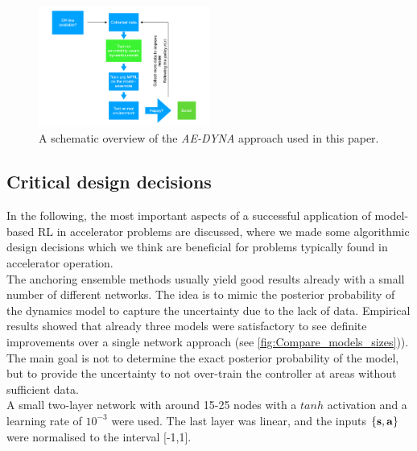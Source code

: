 \documentclass[
reprint,
amsmath,amssymb,amsfonts,clevref,
aps,
prstab,
]{revtex4-2}
\begin{document}
	\begin{figure}[!h]
		\centering
		\includegraphics*[width=0.5\textwidth]{Figures/MBRL_overview}
		\caption{A schematic overview of the \emph{AE-DYNA} approach used in this paper.}
		\label{fig:MBRL_overview}
	\end{figure}
	\subsection{Critical design decisions}\label{ss:critical_design}
In the following, the most important aspects of a successful application of model-based RL in accelerator problems are discussed, where we made some algorithmic design decisions which we think are beneficial for problems typically found in accelerator operation.\\
The anchoring ensemble methods usually yield good results already with a small number of different networks. The idea is to mimic the posterior probability of the dynamics model to capture the uncertainty due to the lack of data. Empirical results showed that already three models were satisfactory to see definite improvements over a single network approach (see \cref{fig:Compare_models_sizes})). The main goal is not to determine the exact posterior probability of the model, but to provide the uncertainty to not over-train the controller at areas without sufficient data.\\ A small two-layer network with around 15-25 nodes with a $tanh$ activation and a learning rate of $10^{-3}$ were used. The last layer was linear, and the inputs $\{\mathbf{s},\mathbf{a}\}$ were normalised to the interval [-1,1].\\
\end{document}
